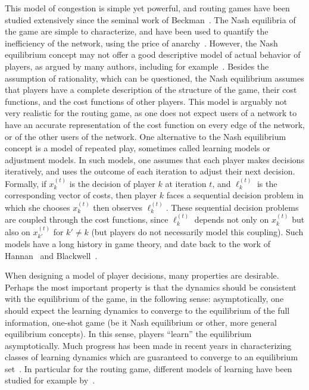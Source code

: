 \documentclass{sig-alternate-ipsn13}
\begin{document}
This model of congestion is simple yet powerful, and routing games have been studied extensively since the seminal work of Beckman~\cite{beckmann1955studies}. The Nash equilibria of the game are simple to characterize, and have been used to quantify the inefficiency of the network, using the price of anarchy~\cite{roughgarden2002bad}. However, the Nash equilibrium concept may not offer a good descriptive model of actual behavior of players, as argued by many authors, including for example~\cite{fox2013population}. Besides the assumption of rationality, which can be questioned, the Nash equilibrium assumes that players have a complete description of the structure of the game, their cost functions, and the cost functions of other players. This model is arguably not very realistic for the routing game, as one does not expect users of a network to have an accurate representation of the cost function on every edge of the network, or of the other users of the network.
One alternative to the Nash equilibrium concept is a model of repeated play, sometimes called learning models or adjustment models. In such models, one assumes that each player makes decisions iteratively, and uses the outcome of each iteration to adjust their next decision. Formally, if $x_k^{(t)}$ is the decision of player $k$ at iteration $t$, and $\ell^{(t)}_k$ is the corresponding vector of costs, then player $k$ faces a sequential decision problem in which she chooses $x^{(t)}_k$ then observes $\ell_k^{(t)}$. These sequential decision problems are coupled through the cost functions, since $\ell_k^{(t)}$ depends not only on $x_k^{(t)}$ but also on $x_{k'}^{(t)}$ for $k' \neq k$ (but players do not necessarily model this coupling). Such models have a long history in game theory, and date back to the work of Hannan~\cite{hannan1957approximations} and Blackwell~\cite{blackwell1956analog}.

When designing a model of player decisions, many properties are desirable. Perhaps the most important property is that the dynamics should be consistent with the equilibrium of the game, in the following sense: asymptotically, one should expect the learning dynamics to converge to the equilibrium of the full information, one-shot game (be it Nash equilibrium or other, more general equilibrium concepts). In this sense, players ``learn'' the equilibrium asymptotically. Much progress has been made in recent years in characterizing classes of learning dynamics which are guaranteed to converge to an equilibrium set~\cite{freund1999adaptive, hart2001general, hart2005adaptive, fox2013population}. In particular for the routing game, different models of learning have been studied for example by~\cite{fischer2004evolution,blum2006routing,kleinberg2009multiplicative,krichene2015learning,krichene2015SMD}.
\end{document}
